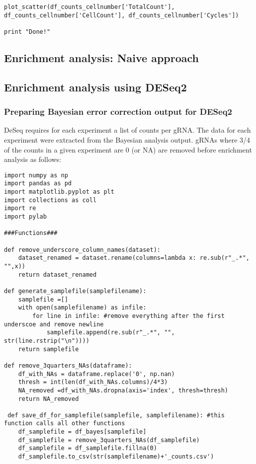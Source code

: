 \begin{footnotesize}
\begin{lstlisting}
plot_scatter(df_counts_cellnumber['TotalCount'], df_counts_cellnumber['CellCount'], df_counts_cellnumber['Cycles'])

print "Done!"
\end{lstlisting}


\subsection{Enrichment analysis: Naive approach}


\subsection{Enrichment analysis using DESeq2}

\subsubsection{Preparing Bayesian error correction output for DESeq2}
DeSeq requires for each experiment a list of counts per gRNA.
The data for each experiment were extracted from the Bayesian analysis output. gRNAs where 3/4 of the counts in a given experiment are 0 (or NA) are removed before enrichment analysis as follows:

\begin{lstlisting}
import numpy as np
import pandas as pd
import matplotlib.pyplot as plt
import collections as coll
import re
import pylab

###Functions###

def remove_underscore_column_names(dataset):
    dataset_renamed = dataset.rename(columns=lambda x: re.sub(r"_.*", "",x))
    return dataset_renamed
    
def generate_samplefile(samplefilename):
    samplefile =[]
    with open(samplefilename) as infile:
        for line in infile: #remove everything after the first underscoe and remove newline
            samplefile.append(re.sub(r"_.*", "", str(line.rstrip("\n"))))
    return samplefile
    
def remove_3quarters_NAs(dataframe):
    df_with_NAs = dataframe.replace('0', np.nan)
    thresh = int(len(df_with_NAs.columns)/4*3)
    NA_removed =df_with_NAs.dropna(axis='index', thresh=thresh)
    return NA_removed
    
 def save_df_for_samplefile(samplefile, samplefilename): #this function calls all other functions
    df_samplefile = df_bayes[samplefile]
    df_samplefile = remove_3quarters_NAs(df_samplefile)
    df_samplefile = df_samplefile.fillna(0)
    df_samplefile.to_csv(str(samplefilename)+'_counts.csv')


\end{lstlisting}
\end{footnotesize}
